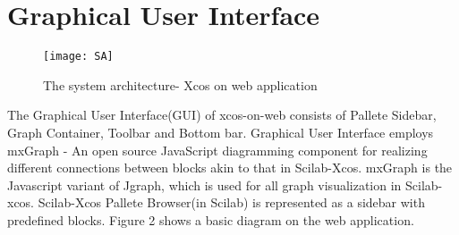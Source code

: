 \documentclass[conference]{IEEEtran}
\begin{document}
\section{Graphical User Interface}
\begin{figure}
    \centering
    \texttt{[image: SA]}
    \caption{The system architecture- Xcos on web application}
    \label{fig:my_label}
\end{figure}
\iffalse
* --What mxgraph is \\
* --Mxrgaph Js equivalent of JGraphX \\
*
* --Wires connection with mid-point snapping and multiple way-points was implemented on the web. \\
* Created a custom delete function to delete all the edges related to a selected mxCell vertices. \\
* --Implemented connection constraints. (Rules) \\
* Rotate, mirror function \\
* Completed the 'link function' -- Each recently created link in the web application can now be styled depending on the source of each link and a 'name' attribute has been set to uniquely identify each type of link. \\
* edges - text label, label font family, label font size, label text color
* --Split-block is now displayed over it's immediate associated edges. \\
* --Tooltip \\
* --port constraints and rules\\
* --right side frame on editor\\
*zoom, print, redo, undo etx\\
*right click functionality(all)\\
*how the details were mapped with data structures\\
*colour wheel jquery code
*import export button fucntionality not working..that will be explained in server side\\
\fi

The Graphical User Interface(GUI) of xcos-on-web consists of Pallete Sidebar, Graph Container, Toolbar and Bottom bar. Graphical User Interface employs mxGraph - An open source JavaScript diagramming component for realizing different connections between blocks akin to that in Scilab-Xcos. mxGraph is the Javascript variant of Jgraph, which is used for all graph visualization in Scilab-xcos. Scilab-Xcos Pallete Browser(in Scilab) is represented as a sidebar with predefined blocks. Figure 2 shows a basic diagram on the web application.
\end{document}

